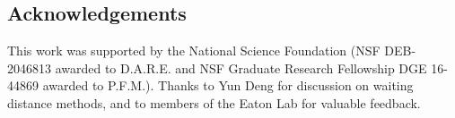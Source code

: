 \documentclass[11pt]{article}
\begin{document}








\subsection{Acknowledgements}
This work was supported by the National Science Foundation 
(NSF DEB-2046813 awarded to D.A.R.E. and NSF Graduate Research Fellowship 
DGE 16-44869 awarded to P.F.M.). Thanks to Yun Deng for discussion
on waiting distance methods, and to members of the Eaton Lab for valuable
feedback.


\end{document}
